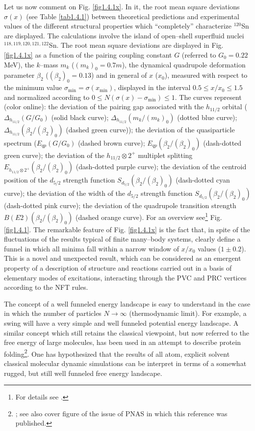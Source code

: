  Let us now  comment on Fig. \ref{fig1.4.1x}. In it, the root mean square deviations $\sigma(x)$ (see Table \ref{tab1.4.1}) between theoretical predictions  and experimental values of the different structural properties which ``completely'' characterize  $^{120}$Sn are displayed. The calculations involve the island of open--shell superfluid nuclei $^{118,119,120,121,122}$Sn. The root mean square deviations are displayed in Fig. \ref{fig1.4.1x} as a function of the pairing coupling constant $G$ (referred to $G_0 = 0.22$ MeV), the $k$--mass $m_k$ ($(m_k)_0 = 0.7 m$),  the dynamical quadrupole deformation parameter $\beta_2$ ($(\beta_{2})_0 = 0.13$)  and in general of $x$ ($x_0$), measured with respect to the minimum value $\sigma_{\textrm{min}} = \sigma (x_{\textrm{min}})$, displayed in the interval $0.5 \leq x/x_0 \leq 1.5$ and normalized according to $0 \leq N(\sigma(x) - \sigma_{\textrm{min}}) \leq 1$.
 The  curves represent (color online): the deviation of the  pairing gap associated with the $h_{11/2}$ orbital 
 ($\Delta_{h_{11/2}} (G/G_0)$ (solid black curve);  
 $\Delta_{h_{11/2}} (m_k/(m_k)_0)$ (dotted blue curve);  $\Delta_{h_{11/2}} (\beta_{2}/(\beta_{2})_0)$ (dashed green curve));
 the deviation of the quasiparticle spectrum ($E_{qp}(G/G_0)$ (dashed brown curve);  $E_{qp}(\beta_{2}/(\beta_{2})_0)$ (dash-dotted green curve);
 the deviation of the $h_{11/2}\otimes 2^+$ multiplet splitting  $E_{h_{11/2}\otimes 2^+}(\beta_{2}/(\beta_{2})_0)$ (dash-dotted purple curve); 
 the deviation of the  centroid position of the $d_{5/2}$ strength function $S_{d_{5/2}}(\beta_{2}/(\beta_{2})_0)$ (dash-dotted cyan curve); 
 the deviation of the width of the $d_{5/2}$ strength function  $S_{d_{5/2}} (\beta_{2}/(\beta_{2})_0)$ (dash-dotted pink curve);
 the deviation  of the  quadrupole transition strength  $B(E2) (\beta_{2}/(\beta_{2})_0)$ (dashed orange curve). For an overview see\footnote{For details see \cite{Idini:15}.} Fig. \ref{fig1.4.1}.
 The remarkable feature of Fig. \ref{fig1.4.1x} is the fact that, in spite of the fluctuations of the results typical of finite  many--body systems, clearly define a funnel in which all minima fall within a narrow window of $x/x_0$ values ($1 \pm 0.2$). This is a novel and unexpected result, which can be considered as an emergent property of a description of structure and reactions carried out in a basis of elementary modes of excitations, interacting through the PVC and PRC vertices according to the NFT rules.
 
 
 
 The concept of a well funneled energy landscape  is easy to understand in the case in which the number of particles $N\rightarrow \infty$ (thermodynamic limit). For example, a swing will have a very simple and well funneled potential energy landscape. A similar concept which still retains the classical viewpoint, but now referred to the free energy of large molecules, has been used in an attempt to describe protein folding\footnote{\cite{Wolynes:16,Wolynes:12}; see also cover figure of the issue of PNAS in which this reference was published.}. One has hypothesized that the results of all atom, explicit solvent classical molecular dynamic simulations can be interpret in terms of a somewhat rugged, but still well funneled free energy landscape.

